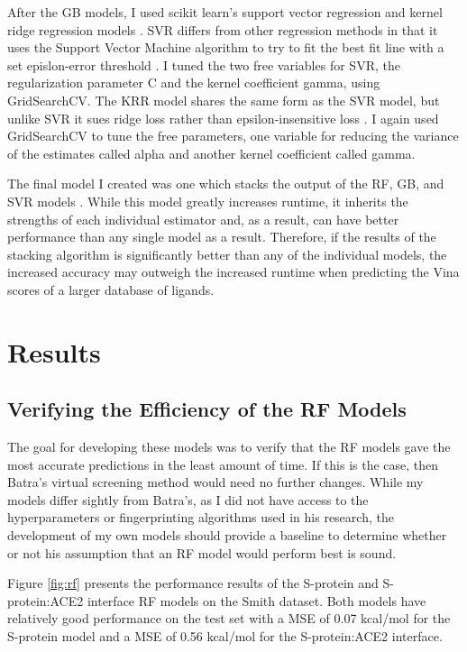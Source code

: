 \documentclass[11pt]{article}
\begin{document}
  After the GB models, I used scikit learn's support vector regression and kernel ridge regression models \cite{scikit}. SVR differs from other regression methods in that it uses the Support Vector Machine algorithm to try to fit the best fit line with a set epislon-error threshold \cite{svrmodel}. I tuned the two free variables for SVR, the regularization parameter C and the kernel coefficient gamma, using GridSearchCV. The KRR model shares the same form as the SVR model, but unlike SVR it sues ridge loss rather than epsilon-insensitive loss \cite{krrmodel}. I again used GridSearchCV to tune the free parameters, one variable for reducing the variance of the estimates called alpha and another kernel coefficient called gamma.
  
  The final model I created was one which stacks the output of the RF, GB, and SVR models \cite{scikit}. While this model greatly increases runtime, it inherits the strengths of each individual estimator and, as a result, can have better performance than any single model as a result. Therefore, if the results of the stacking algorithm is significantly better than any of the individual models, the increased accuracy may outweigh the increased runtime when predicting the Vina scores of a larger database of ligands. 
    
  \section{Results}
  \subsection{Verifying the Efficiency of the RF Models}
  The goal for developing these models was to verify that the RF models gave the most accurate predictions in the least amount of time. If this is the case, then Batra's virtual screening method would need no further changes. While my models differ sightly from Batra's, as I did not have access to the hyperparameters or fingerprinting algorithms used in his research, the development of my own models should provide a baseline to determine whether or not his assumption that an RF model would perform best is sound. 
  
  Figure \ref{fig:rf} presents the performance results of the S-protein and S-protein:ACE2 interface RF models on the Smith dataset. Both models have relatively good performance on the test set with a MSE of 0.07 kcal/mol for the S-protein model and a MSE of 0.56 kcal/mol for the S-protein:ACE2 interface.
    
\end{document}
